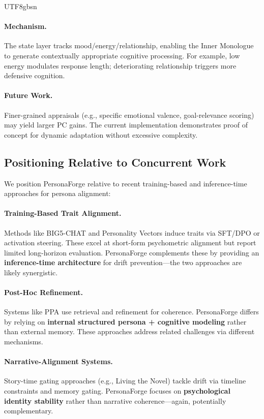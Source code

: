 \documentclass[11pt]{article}
\begin{document}
\begin{CJK*}{UTF8}{gbsn}
\paragraph{Mechanism.} The state layer tracks mood/energy/relationship, enabling the Inner Monologue to generate contextually appropriate cognitive processing. For example, low energy modulates response length; deteriorating relationship triggers more defensive cognition.

\paragraph{Future Work.} Finer-grained appraisals (e.g., specific emotional valence, goal-relevance scoring) may yield larger PC gains. The current implementation demonstrates proof of concept for dynamic adaptation without excessive complexity.

\subsection{Positioning Relative to Concurrent Work}
\label{sec:concurrent_work}

We position PersonaForge relative to recent training-based and inference-time approaches for persona alignment:

\paragraph{Training-Based Trait Alignment.} Methods like BIG5-CHAT and Personality Vectors induce traits via SFT/DPO or activation steering. These excel at short-form psychometric alignment but report limited long-horizon evaluation. PersonaForge complements these by providing an \textbf{inference-time architecture} for drift prevention---the two approaches are likely synergistic.

\paragraph{Post-Hoc Refinement.} Systems like PPA use retrieval and refinement for coherence. PersonaForge differs by relying on \textbf{internal structured persona + cognitive modeling} rather than external memory. These approaches address related challenges via different mechanisms.

\paragraph{Narrative-Alignment Systems.} Story-time gating approaches (e.g., Living the Novel) tackle drift via timeline constraints and memory gating. PersonaForge focuses on \textbf{psychological identity stability} rather than narrative coherence---again, potentially complementary.


\end{CJK*}
\end{document}
